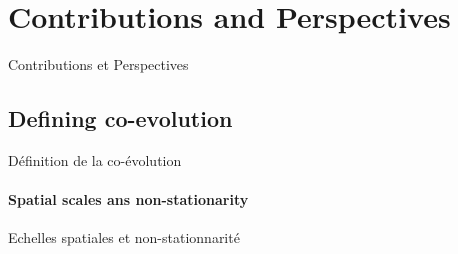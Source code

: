 




\newpage


\section{Contributions and Perspectives}{Contributions et Perspectives}

\label{sec:contributions}




\subsection{Defining co-evolution}{Définition de la co-évolution}












\paragraph{Spatial scales ans non-stationarity}{Echelles spatiales et non-stationnarité}

